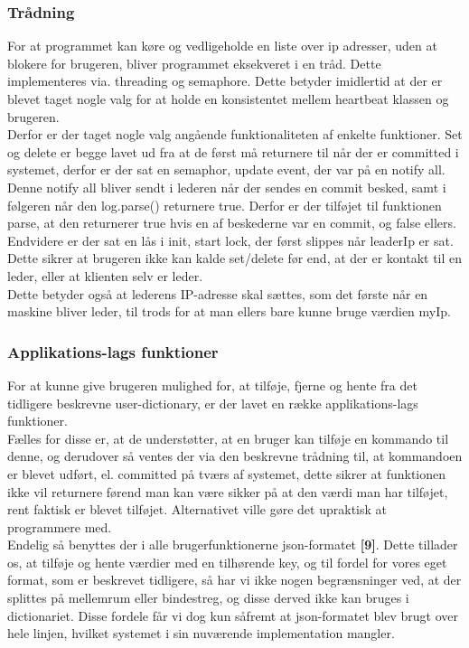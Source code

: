 \documentclass[a4paper,12pt]{article}
\begin{document}
\subsubsection{Trådning}
For at programmet kan køre og vedligeholde en liste over ip adresser, uden at blokere for brugeren, bliver programmet eksekveret i en tråd. Dette implementeres via. threading og semaphore. Dette betyder imidlertid at der er blevet taget nogle valg for at holde en konsistentet mellem heartbeat klassen og brugeren.
\\ 
Derfor er der taget nogle valg angående funktionaliteten af enkelte funktioner.
Set og delete er begge lavet ud fra at de først må returnere til når der er committed i systemet, derfor er der sat en semaphor, update event, der var på en notify all. Denne notify all bliver sendt i lederen når der sendes en commit besked, samt i følgeren når den log.parse() returnere true. Derfor er der tilføjet til funktionen parse, at den returnerer true hvis en af beskederne var en commit, og false ellers.
\\
Endvidere er der sat en lås i init, start lock, der først slippes når leaderIp er sat. Dette sikrer at brugeren ikke kan kalde set/delete før end, at der er kontakt til en leder, eller at klienten selv er leder.
\\
Dette betyder også at lederens IP-adresse skal sættes, som det første når en maskine bliver leder, til trods for at man ellers bare kunne bruge værdien myIp. 

\subsubsection{Applikations-lags funktioner}
For at kunne give brugeren mulighed for, at tilføje, fjerne og hente fra det tidligere beskrevne user-dictionary, er der lavet en række applikations-lags funktioner. \\
Fælles for disse er, at de understøtter, at en bruger kan tilføje en kommando til denne, og derudover så ventes der via den beskrevne trådning til, at kommandoen er blevet udført, el. committed på tværs af systemet, dette sikrer at funktionen ikke vil returnere førend man kan være sikker på at den værdi man har tilføjet, rent faktisk er blevet tilføjet. Alternativet ville gøre det upraktisk at programmere med.
\\[5px]
Endelig så benyttes der i alle brugerfunktionerne json-formatet \textbf{[9]}. Dette tillader os, at tilføje og hente værdier med en tilhørende key, og til fordel for vores eget format, som er beskrevet tidligere, så har vi ikke nogen begrænsninger ved, at der splittes på mellemrum eller bindestreg, og disse derved ikke kan bruges i dictionariet. Disse fordele får vi dog kun såfremt at json-formatet blev brugt over hele linjen, hvilket systemet i sin nuværende implementation mangler.
\newpage
\end{document}
